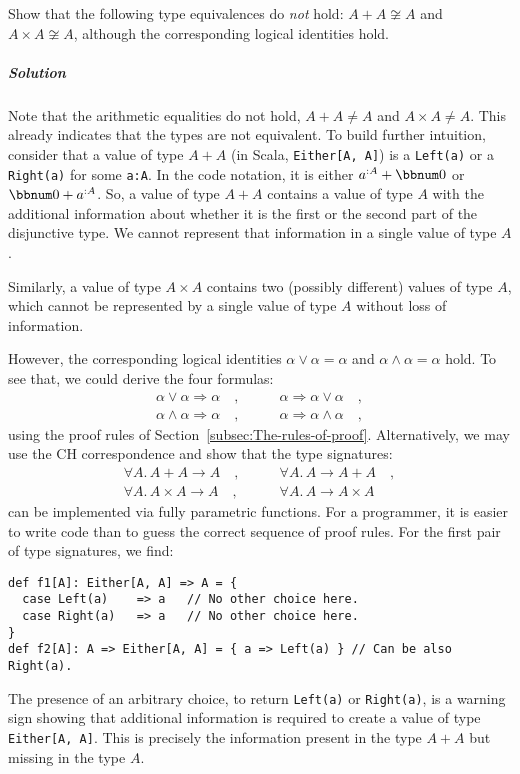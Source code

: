 Show that the following type equivalences do \emph{not} hold: $A+A\not\cong A$
and $A\times A\not\cong A$, although the corresponding logical identities
hold.

\subparagraph{Solution}

Note that the arithmetic equalities do not hold, $A+A\neq A$ and
$A\times A\ne A$. This already indicates that the types are not equivalent.
To build further intuition, consider that a value of type $A+A$ (in
Scala, \lstinline!Either[A, A]!) is a \lstinline!Left(a)! or a \lstinline!Right(a)!
for some \lstinline!a:A!. In the code notation, it is either $a^{:A}+\bbnum 0$
or $\bbnum 0+a^{:A}$. So, a value of type $A+A$ contains a value
of type $A$ with the additional information about whether it is the
first or the second part of the disjunctive type. We cannot represent
that information in a single value of type $A$. 

Similarly, a value of type $A\times A$ contains two (possibly different)
values of type $A$, which cannot be represented by a single value
of type $A$ without loss of information.

However, the corresponding logical identities $\alpha\vee\alpha=\alpha$
and $\alpha\wedge\alpha=\alpha$ hold. To see that, we could derive
the four formulas:
\begin{align*}
\alpha\vee\alpha\Rightarrow\alpha\quad, & \quad\quad\alpha\Rightarrow\alpha\vee\alpha\quad,\\
\alpha\wedge\alpha\Rightarrow\alpha\quad, & \quad\quad\alpha\Rightarrow\alpha\wedge\alpha\quad,
\end{align*}
using the proof rules of Section~\ref{subsec:The-rules-of-proof}.
Alternatively, we may use the CH correspondence and show that the
type signatures:
\begin{align*}
\forall A.\,A+A\rightarrow A\quad, & \quad\quad\forall A.\,A\rightarrow A+A\quad,\\
\forall A.\,A\times A\rightarrow A\quad, & \quad\quad\forall A.\,A\rightarrow A\times A\quad
\end{align*}
can be implemented via fully parametric functions. For a programmer,
it is easier to write code than to guess the correct sequence of proof
rules. For the first pair of type signatures, we find:
\begin{lstlisting}
def f1[A]: Either[A, A] => A = {
  case Left(a)    => a   // No other choice here.
  case Right(a)   => a   // No other choice here.
}
def f2[A]: A => Either[A, A] = { a => Left(a) } // Can be also Right(a).
\end{lstlisting}
The presence of an arbitrary choice, to return \lstinline!Left(a)!
or \lstinline!Right(a)!, is a warning sign showing that additional
information is required to create a value of type \lstinline!Either[A, A]!.
This is precisely the information present in the type $A+A$ but missing
in the type $A$.

